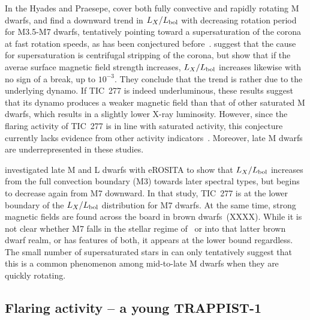 \documentclass[twocolumn]{aastex631}
\begin{document}
In the Hyades and Praesepe, \citet{nunez2022factory} cover both fully convective and rapidly rotating M dwarfs, and find a downward trend in $L_X/L_{\rm bol}$ with decreasing rotation period for M3.5-M7 dwarfs, tentatively pointing toward a supersaturation of the corona at fast rotation speeds, as has been conjectured before~\citep{jeffries2011investigating,ramsay2020tess}.   \citet{jeffries2011investigating} suggest that the cause for supersaturation is centrifugal stripping of the corona, but \citet{reiners2022magnetism} show that if the averae surface magnetic field strength increases, $L_X/L_{\rm bol}$ increases likewise with no sign of a break, up to $10^{-3}$. They conclude that the trend is rather due to the underlying dynamo. If TIC~277 is indeed underluminous, these results suggest that its dynamo produces a weaker magnetic field than that of other saturated M dwarfs, which results in a slightly lower X-ray luminosity. However, since the flaring activity of TIC~277 is in line with saturated activity, this conjecture currently lacks evidence from other activity indicators~\citep[see][, for supersaturation in flaring activity in fully convective M dwarfs]{ramsay2020tess}. Moreover, late M dwarfs are underrepresented in these studies. 

\citet{stelzer2022first} investigated late M and L dwarfs with eROSITA to show that $L_X/L_{\rm bol}$ increases from the full convection boundary (M3) towards later spectral types, but begins to decrease again from M7 downward. In that study, TIC~277 is at the lower boundary of the $L_X/L_{\rm bol}$ distribution for M7 dwarfs. At the same time, strong magnetic fields are found across the board in brown dwarfs~(XXXX). While it is not clear whether M7 falls in the stellar regime of~\citet{reiners2022magnetism} or into that latter brown dwarf realm, or has features of both, it appears at the lower bound regardless. The small number of supersaturated stars in \citet{nunez2022factory}  can only tentatively suggest that this is a common phenomenon among mid-to-late M dwarfs when they are quickly rotating.  



\subsection{Flaring activity -- a young TRAPPIST-1}
\label{sec:discussion:flares}
\end{document}
